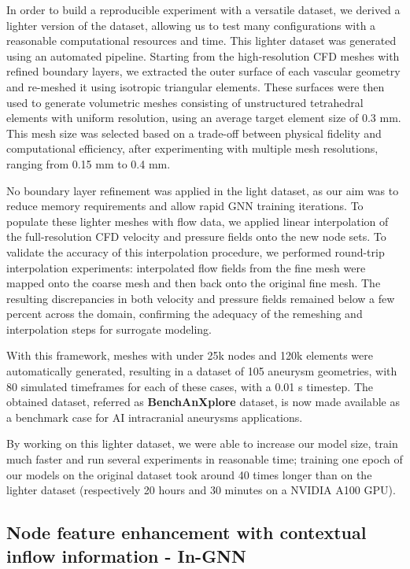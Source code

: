 In order to build a reproducible experiment with a versatile dataset, we derived a lighter version of the dataset, allowing us to test many configurations with a reasonable computational resources and time. This lighter dataset was generated using an automated pipeline. Starting from the high-resolution CFD meshes with refined boundary layers, we extracted the outer surface of each vascular geometry and re-meshed it using isotropic triangular elements. These surfaces were then used to generate volumetric meshes consisting of unstructured tetrahedral elements with uniform resolution, using an average target element size of 0.3 mm. This mesh size was selected based on a trade-off between physical fidelity and computational efficiency, after experimenting with multiple mesh resolutions, ranging from 0.15 mm to 0.4 mm. 

No boundary layer refinement was applied in the light dataset, as our aim was to reduce memory requirements and allow rapid GNN training iterations. To populate these lighter meshes with flow data, we applied linear interpolation of the full-resolution CFD velocity and pressure fields onto the new node sets. To validate the accuracy of this interpolation procedure, we performed round-trip interpolation experiments: interpolated flow fields from the fine mesh were mapped onto the coarse mesh and then back onto the original fine mesh. The resulting discrepancies in both velocity and pressure fields remained below a few percent across the domain, confirming the adequacy of the remeshing and interpolation steps for surrogate modeling.

With this framework, meshes with under 25k nodes and 120k elements were automatically generated, resulting in a dataset of 105 aneurysm geometries, with 80 simulated timeframes for each of these cases, with a 0.01 s timestep. The obtained dataset, referred as \textbf{BenchAnXplore} dataset, is now made available as a benchmark case for AI intracranial aneurysms applications. 

By working on this lighter dataset, we were able to increase our model size, train much faster and run several experiments in reasonable time; training one epoch of our models on the original dataset took around 40 times longer than on the lighter dataset (respectively 20 hours and 30 minutes on a NVIDIA A100 GPU). 


\subsection{Node feature enhancement with contextual inflow information - In-GNN} \label{sec:inflow}

